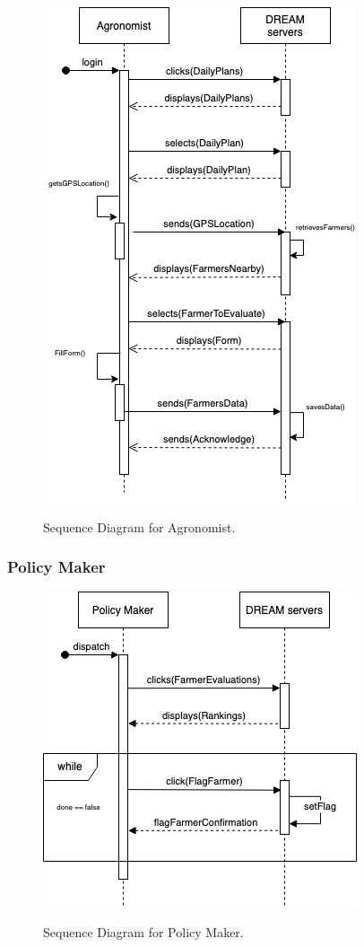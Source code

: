 \begin{figure}[hbt!]
\centering
\includegraphics[scale=0.6]{Files/sequence_disgrams/thePNGs/agronomist_sendReport.png}\\
\caption{\label{fig:agrSeqSendReport}Sequence Diagram for Agronomist.}
\end{figure}

\subsubsection{Policy Maker}



\begin{figure}[hbt!]
\centering
\includegraphics[scale=0.6]{Files/sequence_disgrams/thePNGs/policy_setFlag.png}\\
\caption{\label{fig:policySeqSetFlag}Sequence Diagram for Policy Maker.}
\end{figure}

